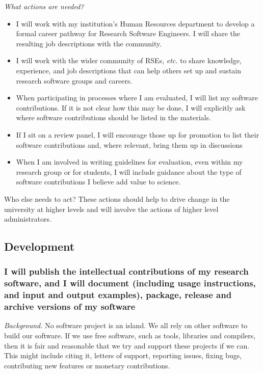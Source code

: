 \documentclass[a4paper,UKenglish]{dagman}
\renewcommand{\paragraph}[1]{\subsubsection*{#1}\xspace}
\newcommand{\etc}{\emph{etc.}\xspace}
\begin{document}
\emph{What actions are needed?}
\begin{itemize}
\item I will work with my institution's Human Resources department to develop a formal career pathway for Research Software Engineers. I will share the resulting job descriptions with the community.
\item I will work with the wider community of RSEs, \etc to share knowledge, experience, and job descriptions that can help others set up and sustain research software groups and careers.
\item When participating in processes where I am evaluated, I will list my software contributions.
If it is not clear how this may be done, I will explicitly ask where software contributions should be listed in the materials.
\item If I sit on a review panel, I will encourage those up for promotion to list their software contributions and, where relevant, bring them up in discussions
\item When I am involved in writing guidelines for evaluation, even within my research group or for students, I will include guidance about the type of software contributions I believe add value to science. 
\end{itemize}

Who else needs to act?
These actions should help to drive change in the university at higher levels and will involve the actions of higher level administrators.

\subsection{Development}

\paragraph{I will publish the intellectual contributions of my research software, and I will document (including usage instructions, and input and output examples), package, release and archive versions of my software}

\emph{Background.}
No software project is an island. We all rely on other software to build our software. If we use free software, such as tools, libraries and compilers, then it is fair and reasonable that we try and support these projects if we can. This might include citing it, letters of support, reporting issues, fixing bugs, contributing new features or monetary contributions.
\end{document}
